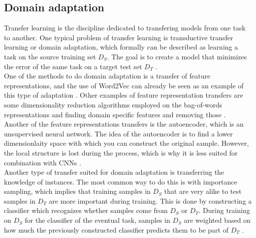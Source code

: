 \subsection{Domain adaptation}
Transfer learning is the discipline dedicated to transfering models from one task to another. One typical problem of transfer learning is transductive transfer learning or domain adaptation, which formally can be described as learning a task on the source training set $\textit{D}_S$. The goal is to create a model that minimizes the error of the same task on a target test set $\textit{D}_T$ \cite{pan2010survey}. \\
One of the methods to do domain adaptation is a transfer of feature representations, and the use of Word2Vec can already be seen as an example of this type of adaptation \cite{nguyen2015event}. Other examples of feature representation transfers are some dimensionality reduction algorithms employed on the bag-of-words representations and finding domain specific features and removing those \cite{pan2010survey}.\\
Another of the feature representations transfers is the autoencoder, which is an unsupervised neural network. The idea of the autoencoder is to find a lower dimensionlaity space with which you can construct the original sample. However, the local structure is lost during the process, which is why it is less suited for combination with CNNs \cite{ganin2014unsupervised}.\\
Another type of transfer suited for domain adaptation is transferring the knowledge of instances. The most common way to do this is with importance sampling, which implies that training samples in $\textit{D}_S$ that are very alike to test samples in $\textit{D}_T$ are more important during training. This is done by constructing a classifier which recognizes whether samples come from $\textit{D}_S$ or $\textit{D}_T$. During training on $\textit{D}_S$ for the classifier of the eventual task, samples in $\textit{D}_S$ are weighted based on how much the previously constructed classifier predicts them to be part of $\textit{D}_T$ \cite{pan2010survey}. 

